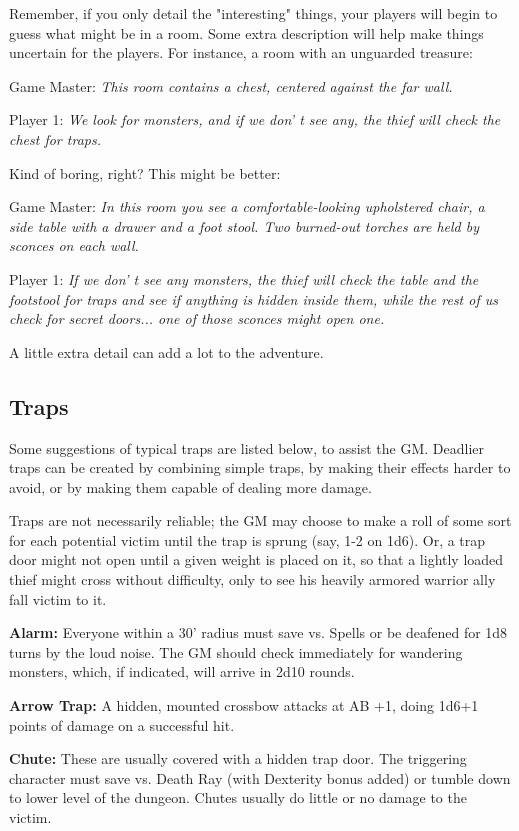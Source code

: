 \documentclass[a4paper,twoside,openany,10pt]{book}
\begin{document}
\begin{multicols}{2}
Remember, if you only detail the "interesting" things, your players will begin to guess what might be in a room. Some extra description will help make things uncertain for the players. For instance, a room with an unguarded treasure:

Game Master:\emph{ This room contains a chest, centered against the far wall.}

Player 1:\emph{ We look for monsters, and if we don' t see any, the thief will check the chest for traps.}

Kind of boring, right? This might be better:

Game Master: \emph{In this room you see a comfortable-looking upholstered chair, a side table with a drawer and a foot stool. Two burned-out torches are held by sconces on each wall.}

Player 1: \emph{If we don' t see any monsters, the thief will check the table and the footstool for traps and see if anything is hidden inside them, while the rest of us check for secret doors... one of those sconces might open one.}

A little extra detail can add a lot to the adventure.

\subsection{Traps}\label{traps-1}

Some suggestions of typical traps are listed below, to assist the GM. Deadlier traps can be created by combining simple traps, by making their effects harder to avoid, or by making them capable of dealing more damage.

Traps are not necessarily reliable; the GM may choose to make a roll of some sort for each potential victim until the trap is sprung (say, 1-2 on 1d6). Or, a trap door might not open until a given weight is placed on it, so that a lightly loaded thief might cross without difficulty, only to see his heavily armored warrior ally fall victim to it.

\textbf{Alarm:} Everyone within a 30' radius must save vs. Spells or be deafened for 1d8 turns by the loud noise. The GM should check immediately for wandering monsters, which, if indicated, will arrive in 2d10 rounds.

\textbf{Arrow Trap:} A hidden, mounted crossbow attacks at AB +1, doing 1d6+1 points of damage on a successful hit.

\textbf{Chute:} These are usually covered with a hidden trap door. The triggering character must save vs. Death Ray (with Dexterity bonus added) or tumble down to lower level of the dungeon. Chutes usually do little or no damage to the victim.


\end{multicols}
\end{document}
